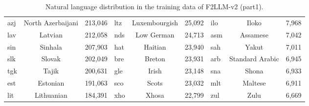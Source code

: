 \begin{table}[th]
{\begin{tabular}{m{1cm}<{\centering}cr|m{1cm}<{\centering}cr|m{1cm}<{\centering}cr}
azj & North Azerbaijani & 213,046 & ltz & Luxembourgish & 25,092 & ilo & Iloko & 7,968 \\
lav & Latvian & 212,058 & nds & Low German & 24,713 & asm & Assamese & 7,042 \\
sin & Sinhala & 207,903 & hat & Haitian & 23,940 & sah & Yakut & 7,011 \\
slk & Slovak & 202,049 & bre & Breton & 23,931 & arb & Standard Arabic & 6,945 \\
tgk & Tajik & 200,631 & gle & Irish & 23,148 & sna & Shona & 6,933 \\
est & Estonian & 191,063 & sco & Scots & 23,032 & mlt & Maltese & 6,911 \\
lit & Lithuanian & 184,391 & xho & Xhosa & 22,799 & zul & Zulu & 6,669 \\
    \bottomrule
    \end{tabular}
    }
    \caption{Natural language distribution in the training data of F2LLM-v2 (part1).}
    \label{tab:language-distribution-1}
\end{table}

